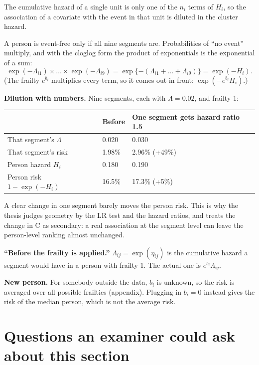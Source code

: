 \documentclass[11pt]{article}
\begin{document}
\begin{thesisline}
The cumulative hazard of a single unit is only one of the $n_i$ terms of $H_i$, so the association
of a covariate with the event in that unit is diluted in the cluster hazard.
\end{thesisline}

A person is event-free only if all nine segments are. Probabilities of ``no event'' multiply, and
with the cloglog form the product of exponentials is the exponential of a sum:
\[
  \exp(-\Lambda_{i1}) \times \dots \times \exp(-\Lambda_{i9}) = \exp\{-(\Lambda_{i1} + \dots + \Lambda_{i9})\} = \exp(-H_i) .
\]
(The frailty $e^{b_i}$ multiplies every term, so it comes out in front: $\exp(-e^{b_i} H_i)$.)

\textbf{Dilution with numbers.} Nine segments, each with $\Lambda = 0.02$, and frailty 1:

\begin{center}
\begin{tabular}{lll}
\toprule
 & Before & One segment gets hazard ratio 1.5 \\
\midrule
That segment's $\Lambda$ & 0.020 & 0.030 \\
That segment's risk & 1.98\% & 2.96\% \;(+49\%) \\
Person hazard $H_i$ & 0.180 & 0.190 \\
Person risk $1 - \exp(-H_i)$ & 16.5\% & 17.3\% \;(+5\%) \\
\bottomrule
\end{tabular}
\end{center}

A clear change in one segment barely moves the person risk. This is why the thesis judges geometry
by the LR test and the hazard ratios, and treats the change in C as secondary: a real association at
the segment level can leave the person-level ranking almost unchanged.

\textbf{``Before the frailty is applied.''} $\Lambda_{ij} = \exp(\eta_{ij})$ is the cumulative
hazard a segment would have in a person with frailty 1. The actual one is $e^{b_i}\Lambda_{ij}$.

\textbf{New person.} For somebody outside the data, $b_i$ is unknown, so the risk is averaged over
all possible frailties (appendix). Plugging in $b_i = 0$ instead gives the risk of the median
person, which is not the average risk.

\section{Questions an examiner could ask about this section}
\end{document}
